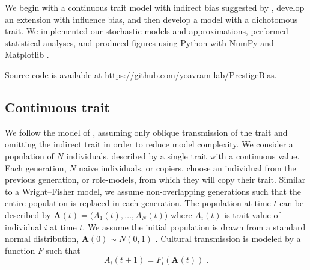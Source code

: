 \documentclass[12pt]{extarticle}
\let\vec\mathbf
\begin{document}
We begin with a continuous trait model with indirect bias suggested by \citet{evolutionBook}, develop an extension with influence bias, and then develop a model with a dichotomous trait.
We implemented our stochastic models and approximations, performed statistical analyses, and produced figures using Python \citep{python} with NumPy \citep{numpy} and Matplotlib \citep{mathplotlib}. 
 
Source code is available at \href{https://github.com/yoavram-lab/PrestigeBias}{https://github.com/yoavram-lab/PrestigeBias}.

\subsection*{Continuous trait}
We follow the model of \citet{evolutionBook}, assuming only oblique transmission of the trait and omitting the indirect trait in order to reduce model complexity. 
We consider a population of $N$ individuals, described by a single trait with a continuous value.
Each generation, $N$ naive individuals, or copiers, choose an individual from the previous generation, or role-models, from which they will copy their trait. Similar to a Wright–Fisher model, we assume non-overlapping generations such that the entire population is replaced in each generation.
The population at time $t$ can be described by $\vec{A}(t)=\big(A_{1}(t), \ldots, A_{N}(t)\big)$ where $A_{i}(t)$ is trait value of individual $i$ at time $t$. We assume the initial population is drawn from a standard normal distribution, $\vec{A}(0) \sim N(0,1)$ .
Cultural transmission is modeled by a function $F$ such that 
\begin{equation}\label{eq:transmission}
A_{i}(t+1) = F_i(\vec{A}(t)) \;.
\end{equation}
\end{document}
